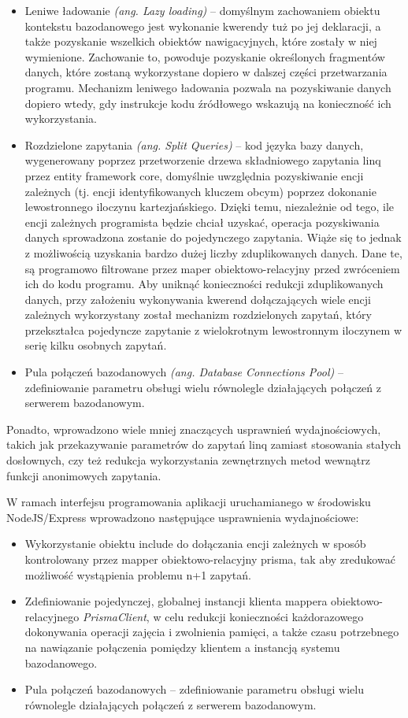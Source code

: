 \begin{itemize}
    \item Leniwe ładowanie \textit{(ang. Lazy loading)} -- domyślnym zachowaniem obiektu kontekstu bazodanowego jest wykonanie kwerendy tuż po jej deklaracji, a także pozyskanie wszelkich obiektów nawigacyjnych, które zostały w niej wymienione. Zachowanie to, powoduje pozyskanie określonych fragmentów danych, które zostaną wykorzystane dopiero w dalszej części przetwarzania programu. Mechanizm leniwego ładowania pozwala na pozyskiwanie danych dopiero wtedy, gdy instrukcje kodu źródłowego wskazują na konieczność ich wykorzystania.
    \item Rozdzielone zapytania \textit{(ang. Split Queries)} -- kod języka bazy danych, wygenerowany poprzez przetworzenie drzewa składniowego zapytania linq przez entity framework core, domyślnie uwzględnia pozyskiwanie encji zależnych (tj. encji identyfikowanych kluczem obcym) poprzez dokonanie lewostronnego iloczynu kartezjańskiego. Dzięki temu, niezależnie od tego, ile encji zależnych programista będzie chciał uzyskać, operacja pozyskiwania danych sprowadzona zostanie do pojedynczego zapytania. Wiąże się to jednak z możliwością uzyskania bardzo dużej liczby zduplikowanych danych. Dane te, są programowo filtrowane przez maper obiektowo-relacyjny przed zwróceniem ich do kodu programu. Aby uniknąć konieczności redukcji zduplikowanych danych, przy założeniu wykonywania kwerend dołączających wiele encji zależnych wykorzystany został mechanizm rozdzielonych zapytań, który przekształca pojedyncze zapytanie z wielokrotnym lewostronnym iloczynem w serię kilku osobnych zapytań.
    \item Pula połączeń bazodanowych \textit{(ang. Database Connections Pool)} -- zdefiniowanie parametru obsługi wielu równolegle działających połączeń z serwerem bazodanowym. 
\end{itemize}

Ponadto, wprowadzono wiele mniej znaczących usprawnień wydajnościowych, takich jak przekazywanie parametrów do zapytań linq zamiast stosowania stałych dosłownych, czy też redukcja wykorzystania zewnętrznych metod wewnątrz funkcji anonimowych zapytania. 

W ramach interfejsu programowania aplikacji uruchamianego w środowisku NodeJS/Express wprowadzono następujące usprawnienia wydajnościowe:
\begin{itemize}
    \item Wykorzystanie obiektu include do dołączania encji zależnych w sposób kontrolowany przez mapper obiektowo-relacyjny prisma, tak aby zredukować możliwość wystąpienia problemu n+1 zapytań.
    \item Zdefiniowanie pojedynczej, globalnej instancji klienta mappera obiektowo-relacyjnego \textit{PrismaClient}, w celu redukcji konieczności każdorazowego dokonywania operacji zajęcia i zwolnienia pamięci, a także czasu potrzebnego na nawiązanie połączenia pomiędzy klientem a instancją systemu bazodanowego.
    \item Pula połączeń bazodanowych -- zdefiniowanie parametru obsługi wielu równolegle działających połączeń z serwerem bazodanowym. 
\end{itemize}

